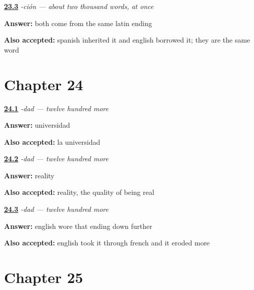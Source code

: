 \noindent\begin{minipage}[t]{\linewidth}
\raggedright
\hyperlink{review-ES-C56-cion-why}{\textbf{23.3}} \emph{-ción — about two thousand words, at once}\par
\small \textbf{Answer:} both come from the same latin ending\par
\footnotesize \textbf{Also accepted:} spanish inherited it and english borrowed it; they are the same word
\end{minipage}\par\medskip

\section*{Chapter 24}

\noindent\begin{minipage}[t]{\linewidth}
\raggedright
\hyperlink{review-ES-C56-dad-make}{\textbf{24.1}} \emph{-dad — twelve hundred more}\par
\small \textbf{Answer:} universidad\par
\footnotesize \textbf{Also accepted:} la universidad
\end{minipage}\par\medskip

\noindent\begin{minipage}[t]{\linewidth}
\raggedright
\hyperlink{review-ES-C56-dad-read}{\textbf{24.2}} \emph{-dad — twelve hundred more}\par
\small \textbf{Answer:} reality\par
\footnotesize \textbf{Also accepted:} reality, the quality of being real
\end{minipage}\par\medskip

\noindent\begin{minipage}[t]{\linewidth}
\raggedright
\hyperlink{review-ES-C56-dad-why}{\textbf{24.3}} \emph{-dad — twelve hundred more}\par
\small \textbf{Answer:} english wore that ending down further\par
\footnotesize \textbf{Also accepted:} english took it through french and it eroded more
\end{minipage}\par\medskip

\section*{Chapter 25}

